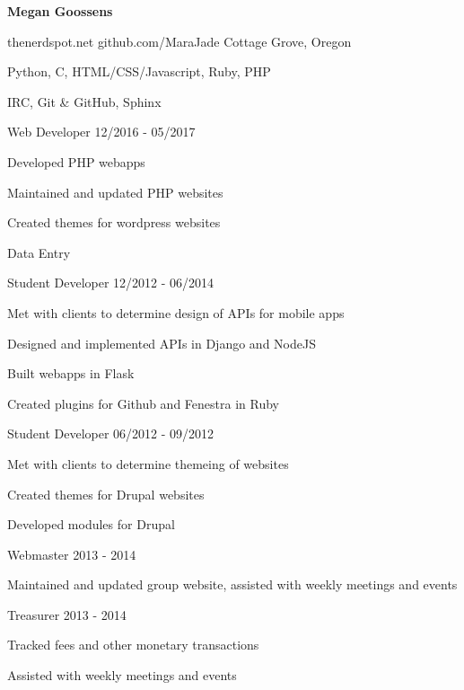 \documentclass[11pt]{article} %
\begin{document}
\centerline{{\Huge \bf Megan Goossens}}
\bigskip


        {thenerdspot.net}
        {github.com/MaraJade}
        {Cottage Grove, Oregon}



      {Python, C, HTML/CSS/Javascript, Ruby, PHP}

      {IRC, Git \& GitHub, Sphinx}


\begin{description}
\squish
{}
           {Web Developer}
           {12/2016 - 05/2017}

Developed PHP webapps

Maintained and updated PHP websites

Created themes for wordpress websites

Data Entry


           {Student Developer}
           {12/2012 - 06/2014}

Met with clients to determine design of APIs for mobile apps

Designed and implemented APIs in Django and NodeJS

Built webapps in Flask

Created plugins for Github and Fenestra in Ruby


           {Student Developer}
           {06/2012 - 09/2012}

Met with clients to determine themeing of websites

Created themes for Drupal websites

Developed modules for Drupal


\end{description}


\begin{description}
\squish
{}
           {Webmaster}
           {2013 - 2014}

Maintained and updated group website, assisted with weekly meetings and events

           {Treasurer}
           {2013 - 2014}

Tracked fees and other monetary transactions

Assisted with weekly meetings and events


\end{description}
\end{document}
